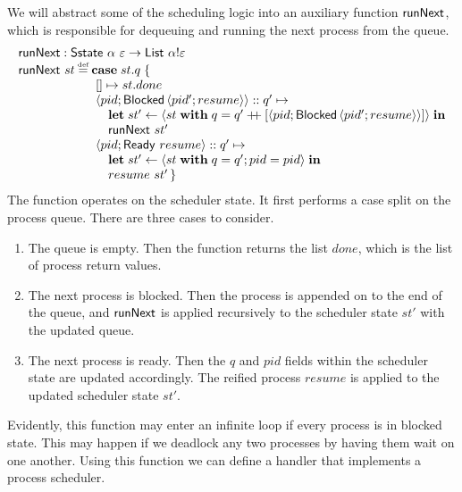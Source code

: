 \documentclass[12pt,phd,lfcs,twoside,openright,logo,leftchapter,normalheadings]{infthesis}
\theoremstyle{plain}
\theoremstyle{definition}
\begin{document}
We will abstract some of the scheduling logic into an auxiliary
function $\mathsf{runNext}$, which is responsible for dequeuing and running
the next process from the queue.
%
\[
  \bl
    \runNext : \Sstate~\alpha~\varepsilon \to \List~\alpha \eff \varepsilon\\
    \runNext~st \defas
      \bl
        \Case\;st.q\;\{\\
        ~\bl
           \nil \mapsto st.done\\
           \Record{pid;\Blocked\,\Record{pid';resume}} \cons q' \mapsto\\
             \quad\bl
               \Let\;st' \revto \Record{st \;\With\; q = q' \concat [\Record{pid;\Blocked\,\Record{pid';resume}}]}\;\In\\
               \runNext~st'
             \el\\
           \Record{pid;\Ready~resume} \cons q' \mapsto\\
             \quad\bl
               \Let\;st' \revto \Record{st \;\With\; q = q'; pid = pid}\;\In\\
               resume~st'\,\}
             \el
         \el
      \el
  \el
\]
%
The function operates on the scheduler state. It first performs a case
split on the process queue. There are three cases to consider.
\begin{enumerate}
  \item The queue is empty. Then the function returns the list $done$,
    which is the list of process return values.
  \item The next process is blocked. Then the process is appended on
    to the end of the queue, and $\mathsf{runNext}$ is applied recursively to
    the scheduler state $st'$ with the updated queue.
  \item The next process is ready. Then the $q$ and $pid$ fields
    within the scheduler state are updated accordingly. The reified
    process $resume$ is applied to the updated scheduler state $st'$.
\end{enumerate}
%
Evidently, this function may enter an infinite loop if every process
is in blocked state. This may happen if we deadlock any two processes
by having them wait on one another.  Using this function we can define
a handler that implements a process scheduler.
%
\end{document}
